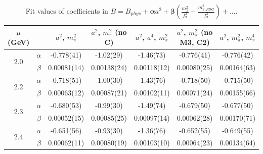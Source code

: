 \documentclass[12pt]{extarticle}
\begin{document}
\begin{table}[h!]
\begin{center}
\begin{tabular}{|c c|c|c|c|c|c|}
\hline
$\mu$ (GeV) &  & $a^2$, $m_\pi^2$& $a^2$, $m_\pi^2$ (no C)& $a^2$, $a^4$, $m_\pi^2$& $a^2$, $m_\pi^2$ (no M3, C2)& $a^2$, $m_\pi^2$, $m_\pi^4$\\
\hline
\multirow{2}{0.5in}{2.0} & $\alpha$ & -0.778(41)& -1.02(29)& -1.46(73)& -0.776(41)& -0.776(42)\\
 & $\beta$ & 0.00081(14)& 0.00138(24)& 0.00118(12)& 0.00080(25)& 0.00164(63)\\
\hline
\multirow{2}{0.5in}{2.2} & $\alpha$ & -0.718(51)& -1.00(30)& -1.43(76)& -0.718(50)& -0.715(50)\\
 & $\beta$ & 0.00063(12)& 0.00087(21)& 0.00102(11)& 0.00071(24)& 0.00155(66)\\
\hline
\multirow{2}{0.5in}{2.3} & $\alpha$ & -0.680(53)& -0.99(30)& -1.49(74)& -0.679(50)& -0.677(50)\\
 & $\beta$ & 0.00052(15)& 0.00085(25)& 0.00097(14)& 0.00062(28)& 0.00170(71)\\
\hline
\multirow{2}{0.5in}{2.4} & $\alpha$ & -0.651(56)& -0.93(30)& -1.36(76)& -0.652(55)& -0.649(55)\\
 & $\beta$ & 0.00062(11)& 0.00080(19)& 0.00103(10)& 0.00064(23)& 0.00134(64)\\
\hline
\end{tabular}
\caption{Fit values of coefficients in $B = B_{phys} + \mathbf{\alpha} a^2 + \mathbf{\beta}\left(\frac{m_\pi^2}{f_\pi^2}-\frac{m_{\pi,PDG}^2}{f_\pi^2}\right) + \ldots$.}
\end{center}
\end{table}




















\clearpage
\end{document}
